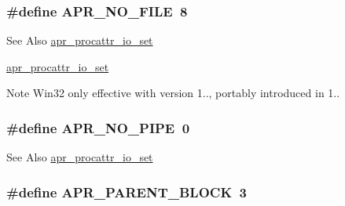 \hypertarget{group__apr__thread__proc_ga597fb6a501c20cc3a597fe6c613f4310}{
\subsubsection[{A\-P\-R\-\_\-\-N\-O\-\_\-\-F\-I\-L\-E}]{\setlength{\rightskip}{0pt plus 5cm}\#define A\-P\-R\-\_\-\-N\-O\-\_\-\-F\-I\-L\-E~8}}\label{group__apr__thread__proc_ga597fb6a501c20cc3a597fe6c613f4310}
\begin{DoxySeeAlso}{See Also}
\hyperlink{group__apr__thread__proc_ga2b1598bc6f5ab0bfcf2e55096d563c98}{apr\-\_\-procattr\-\_\-io\-\_\-set}

\hyperlink{group__apr__thread__proc_ga2b1598bc6f5ab0bfcf2e55096d563c98}{apr\-\_\-procattr\-\_\-io\-\_\-set} 
\end{DoxySeeAlso}
\begin{DoxyNote}{Note}
Win32 only effective with version 1.., portably introduced in 1.. 
\end{DoxyNote}
\hypertarget{group__apr__thread__proc_gab7cfcb8ed24e6c0a76cd41b5b113ae95}{
\subsubsection[{A\-P\-R\-\_\-\-N\-O\-\_\-\-P\-I\-P\-E}]{\setlength{\rightskip}{0pt plus 5cm}\#define A\-P\-R\-\_\-\-N\-O\-\_\-\-P\-I\-P\-E~0}}\label{group__apr__thread__proc_gab7cfcb8ed24e6c0a76cd41b5b113ae95}
\begin{DoxySeeAlso}{See Also}
\hyperlink{group__apr__thread__proc_ga2b1598bc6f5ab0bfcf2e55096d563c98}{apr\-\_\-procattr\-\_\-io\-\_\-set} 
\end{DoxySeeAlso}
\hypertarget{group__apr__thread__proc_ga8653bab028b1c2b98754babc2547f988}{
\subsubsection[{A\-P\-R\-\_\-\-P\-A\-R\-E\-N\-T\-\_\-\-B\-L\-O\-C\-K}]{\setlength{\rightskip}{0pt plus 5cm}\#define A\-P\-R\-\_\-\-P\-A\-R\-E\-N\-T\-\_\-\-B\-L\-O\-C\-K~3}}\label{group__apr__thread__proc_ga8653bab028b1c2b98754babc2547f988}

